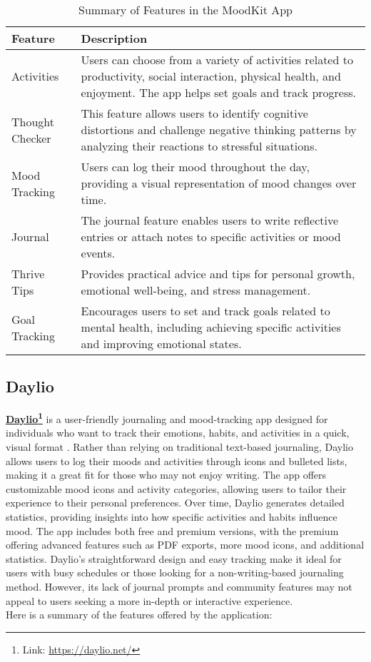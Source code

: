 \FloatBarrier
\begin{table}[ht]
\centering
\begin{tabular}{|p{4cm}|p{10cm}|}
\hline
\textbf{Feature} & \textbf{Description} \\ \hline
Activities & Users can choose from a variety of activities related to productivity, social interaction, physical health, and enjoyment. The app helps set goals and track progress. \\ \hline
Thought Checker & This feature allows users to identify cognitive distortions and challenge negative thinking patterns by analyzing their reactions to stressful situations. \\ \hline
Mood Tracking & Users can log their mood throughout the day, providing a visual representation of mood changes over time. \\ \hline
Journal & The journal feature enables users to write reflective entries or attach notes to specific activities or mood events. \\ \hline
Thrive Tips & Provides practical advice and tips for personal growth, emotional well-being, and stress management. \\ \hline
Goal Tracking & Encourages users to set and track goals related to mental health, including achieving specific activities and improving emotional states. \\ \hline
\end{tabular}
\caption{Summary of Features in the MoodKit App}
\label{tab:moodkit_features}
\end{table}
\FloatBarrier

\subsection{Daylio}

\textbf{\href{https://daylio.net/}{Daylio}\footnote{Link: \url{https://daylio.net/}}} is a user-friendly journaling and mood-tracking app designed for individuals who want to track their emotions, habits, and activities in a quick, visual format \cite{daylio-review}. Rather than relying on traditional text-based journaling, Daylio allows users to log their moods and activities through icons and bulleted lists, making it a great fit for those who may not enjoy writing. The app offers customizable mood icons and activity categories, allowing users to tailor their experience to their personal preferences. Over time, Daylio generates detailed statistics, providing insights into how specific activities and habits influence mood. The app includes both free and premium versions, with the premium offering advanced features such as PDF exports, more mood icons, and additional statistics. Daylio's straightforward design and easy tracking make it ideal for users with busy schedules or those looking for a non-writing-based journaling method. However, its lack of journal prompts and community features may not appeal to users seeking a more in-depth or interactive experience.\vspace{5mm} \\
Here is a summary of the features offered by the application:\vspace{5mm}

